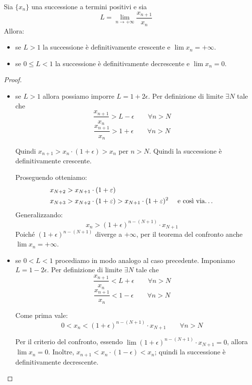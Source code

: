 \begin{theorem}
Sia $\{x_n\}$ una successione a termini positivi e sia 
\begin{equation*}
L = \lim_{n \to +\infty} \frac{x_{n+1}}{x_n}
\end{equation*}
Allora:
\begin{itemize}
\item se $L > 1$ la successione è definitivamente crescente e $\lim x_n = +\infty$.
\item se $0 \le L < 1$ la successione è definitivamente decrescente e $\lim x_n = 0$.
\end{itemize}
\end{theorem}

\begin{proof} \hfill
\begin{itemize}
\item se $L > 1$ allora possiamo imporre $L = 1 + 2\epsilon$. Per definizione di limite $\exists N$ tale che 
\begin{equation*}
\frac{x_{n+1}}{x_n} > L - \epsilon \qquad \forall n > N
\end{equation*}
\begin{equation*}
\frac{x_{n+1}}{x_n} > 1 + \epsilon \qquad \forall n > N
\end{equation*}

Quindi $x_{n+1} > x_n \cdot (1+\epsilon) > x_n$ per $n > N$. Quindi la successione è definitivamente crescente.

Proseguendo otteniamo:
\begin{align*}
x_{N+2} &> x_{N+1} \cdot (1+\epsilon) \\
x_{N+3} &> x_{N+2} \cdot (1+\epsilon) > x_{N+1} \cdot (1+\epsilon)^2 \quad \text { e così via\dots}
\end{align*}
Generalizzando:
\begin{equation*}
x_n > (1+\epsilon)^{n-(N+1)} \cdot x_{N+1}
\end{equation*}
Poiché $(1+\epsilon)^{n-(N+1)}$ diverge a $+\infty$, per il teorema del confronto anche $\lim x_n = +\infty$.

\item se $0 < L < 1$ procediamo in modo analogo al caso precedente. Imponiamo $L = 1 - 2\epsilon$. Per definizione di limite $\exists N$ tale che
\begin{equation*}
\frac{x_{n+1}}{x_n} < L + \epsilon \qquad \forall n > N
\end{equation*}
\begin{equation*}
\frac{x_{n+1}}{x_n} < 1 - \epsilon \qquad \forall n > N
\end{equation*}

Come prima vale:
\begin{equation*}
0 < x_n < (1+\epsilon)^{n-(N+1)} \cdot x_{N+1} \qquad \forall n>N
\end{equation*}

Per il criterio del confronto, essendo $\lim (1+\epsilon)^{n-(N+1)} \cdot x_{N+1} = 0$, allora $\lim x_n = 0$. Inoltre, $x_{n+1} < x_n \cdot (1 - \epsilon) < x_n$; quindi la successione è definitivamente decrescente.
\end{itemize}
\end{proof}
